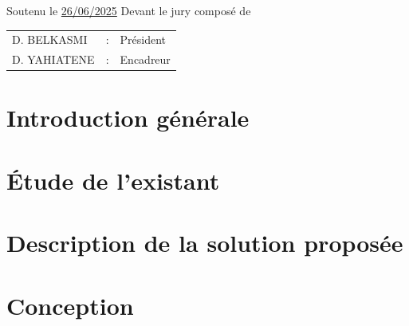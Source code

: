\documentclass[12pt,a4paper]{report}
\begin{document}
\begin{titlepage}
\begin{center}
\begin{center}
    Soutenu le \underline{26/06/2025} Devant le jury composé de
\end{center}

\begin{center}
    \begin{tabular}{l c l}
        D. BELKASMI & : & Président \\
        D. YAHIATENE & : & Encadreur \\
    \end{tabular}
\end{center}

\end{center}
\end{titlepage}





\tableofcontents
\listoffigures

\chapter*{Introduction générale}



\chapter{Étude de l'existant}


\chapter{Description de la solution proposée}



\chapter{Conception}

\end{document}
